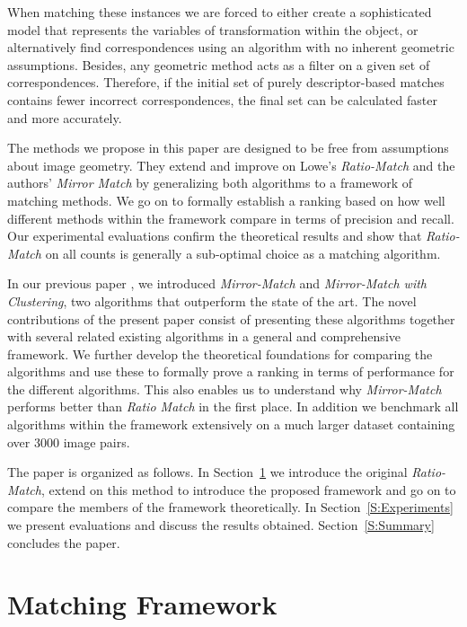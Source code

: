\documentclass[review]{elsarticle}
\begin{document}
When matching these instances we are forced to either create a sophisticated model that represents the variables of transformation within the object, or alternatively find correspondences using an algorithm with no inherent geometric assumptions. Besides, any geometric method acts as a filter on a given set of correspondences.  Therefore, if the initial set of purely descriptor-based matches contains fewer incorrect correspondences, the final set can be calculated faster and more accurately.

The methods we propose in this paper are designed to be free from assumptions about image geometry. They extend and improve on Lowe's \emph{Ratio-Match} \cite{lowe2004sift} and the authors' \emph{Mirror Match} \cite{arnfred2013mirror} by generalizing both algorithms to a framework of matching methods. We go on to formally establish a ranking based on how well different methods within the framework compare in terms of precision and recall. Our experimental evaluations confirm the theoretical results and show that \emph{Ratio-Match} on all counts is generally a sub-optimal choice as a matching algorithm. 

In our previous paper \cite{arnfred2013mirror}, we introduced \emph{Mirror-Match} and \emph{Mirror-Match with Clustering}, two algorithms that outperform the state of the art. The novel contributions of the present paper consist of presenting  these algorithms together with several related existing algorithms in a general and comprehensive framework.  We further develop the theoretical foundations for comparing the algorithms and use these to formally prove a ranking in terms of performance for the different algorithms. This also enables us to understand why \emph{Mirror-Match} performs better than \emph{Ratio Match} in the first place.  In addition we benchmark all algorithms within the framework extensively on a much larger dataset containing over 3000 image pairs.

The paper is organized as follows. In Section~\ref{S:MatchingMethods} we introduce the original \emph{Ratio-Match}, extend on this method to introduce the proposed framework and go on to compare the members of the framework theoretically.  In Section~\ref{S:Experiments} we present evaluations and discuss the results obtained.  Section~\ref{S:Summary} concludes the paper.

\section{Matching Framework}
\label{S:MatchingMethods}
%
\end{document}
